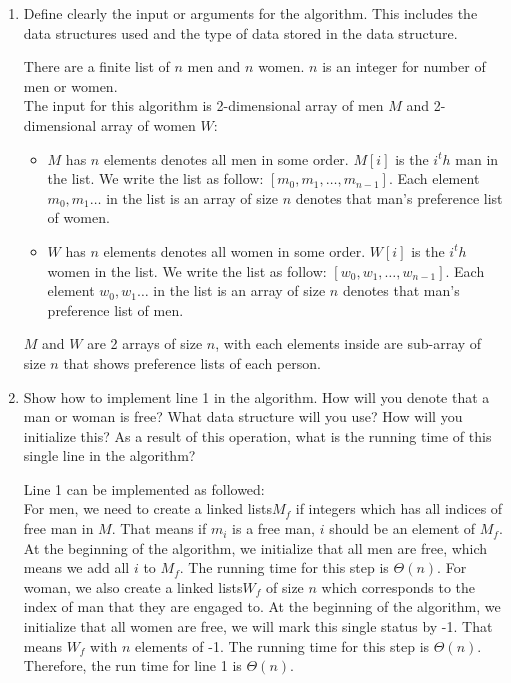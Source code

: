 \documentclass{cpsc413Solutions}
\begin{document}
\begin{problemlist}
\begin{problem}
\begin{answer}
\begin{enumerate}
    \item Deﬁne clearly the input or arguments for the algorithm. This includes the data structures used and the type of data stored in the data structure. 
    
    There are a finite list of $n$ men and $n$ women. $n$ is an integer for number of men or women.\\
    The input for this algorithm is 2-dimensional array of men $M$ and 2-dimensional array of women $W$:
    \begin{itemize}
        \item $M$ has $n$ elements denotes all men in some order. $M[i]$ is the $i^th$ man in the list. We write the list as follow: $[m_0,m_1,\dots, m_{n-1}]$. Each element $m_0, m_1 \dots$ in the list is an array of size $n$ denotes that man's preference list of women.
        \item $W$ has $n$ elements denotes all women in some order. $W[i]$ is the $i^th$ women in the list. We write the list as follow: $[w_0,w_1,\dots, w_{n-1}]$. Each element $w_0, w_1 \dots$ in the list is an array of size $n$ denotes that man's preference list of men.
    \end{itemize}
    $M$ and $W$ are 2 arrays of size $n$, with each elements inside are sub-array of size $n$ that shows preference lists of each person. 
    
    \item Show how to implement line 1 in the algorithm. How will you denote that a man or woman is free? What data structure will you use? How will you initialize this? As a result of this operation, what is the running time of this single line in the algorithm? 
    
    Line 1 can be implemented as followed:\\
    For men, we need to create a linked lists$M_f$ if integers which has all indices of free man in $M$. That means if $m_i$ is a free man, $i$ should be an element of $M_f$. At the beginning of the algorithm, we initialize that all men are free, which means we add all $i$ to $M_f$. The running time for this step is $\Theta(n)$.
    For woman, we also create a linked lists$W_f$ of size $n$ which corresponds to the index of man that they are engaged to. At the beginning of the algorithm, we initialize that all women are free, we will mark this single status by -1. That means $W_f$ with $n$ elements of -1. The running time for this step is $\Theta(n)$.
    Therefore, the run time for line 1 is $\Theta(n)$.
    

\end{enumerate}
\end{answer}
\end{problem}
\end{problemlist}
\end{document}
